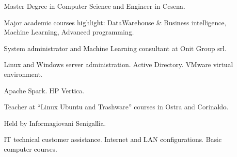\documentclass[helvetica,narrow,openbib,notitle,flagCMYK]{europecv}
\begin{document}
	\begin{europecv}
	\ecvpersonalinfo[20pt]


	\ecvlanguageheader{(*)}
	\ecvlanguagefooter{(*)}

	 {
				Master Degree in Computer Science and Engineer in Cesena.

				Major academic courses highlight: DataWarehouse & Business intelligence, Machine Learning, Advanced programming.}

	 {
			System administrator and Machine Learning consultant at Onit Group srl.

			Linux and Windows server administration. Active Directory. VMware virtual environment.

			Apache Spark. HP Vertica.
	}
	 {
			Teacher at ``Linux Ubuntu and Trashware'' courses in Ostra and Corinaldo.

			Held by Informagiovani Senigallia.
	}
	 {
			IT technical customer assistance. Internet and LAN configurations. Basic computer courses.
	}


\end{europecv}
\end{document}
